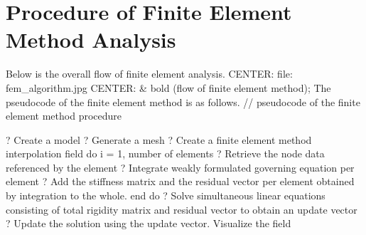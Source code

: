 \section{Procedure of Finite Element Method Analysis}
Below is the overall flow of finite element analysis.
CENTER: file: fem_algorithm.jpg
CENTER: & bold (flow of finite element method);
The pseudocode of the finite element method is as follows.
 // pseudocode of the finite element method procedure

 ? Create a model
 ? Generate a mesh
 ? Create a finite element method interpolation field
 do i = 1, number of elements
 ? Retrieve the node data referenced by the element
 ? Integrate weakly formulated governing equation per element
 ? Add the stiffness matrix and the residual vector per element obtained by integration to the whole.
 end do
 ? Solve simultaneous linear equations consisting of total rigidity matrix and residual vector to obtain an update vector
 ? Update the solution using the update vector.
 Visualize the field
\fi


